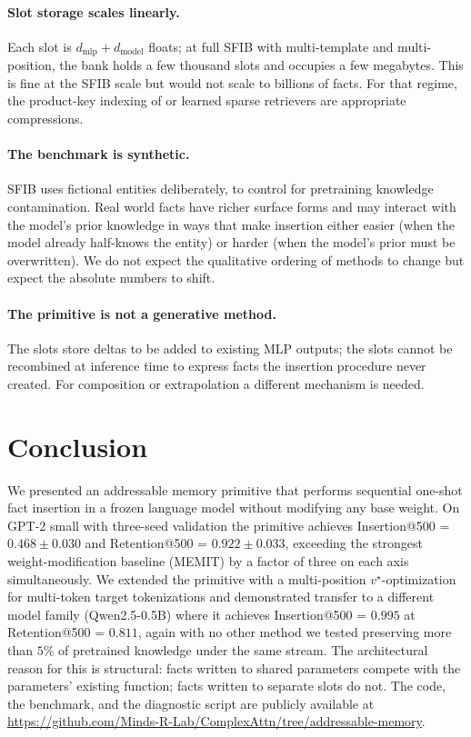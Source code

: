 \documentclass[11pt,a4paper]{article}
\begin{document}
\paragraph{Slot storage scales linearly.} Each slot is
$d_\text{mlp} + d_\text{model}$ floats; at full SFIB with multi-template
and multi-position, the bank holds a few thousand slots and occupies a
few megabytes. This is fine at the SFIB scale but would not scale to
billions of facts. For that regime, the product-key indexing of
\citet{lample2019large} or learned sparse retrievers
\citep{khattab2020colbert} are appropriate compressions.

\paragraph{The benchmark is synthetic.} SFIB uses fictional entities
deliberately, to control for pretraining knowledge contamination. Real
world facts have richer surface forms and may interact with the model's
prior knowledge in ways that make insertion either easier (when the
model already half-knows the entity) or harder (when the model's prior
must be overwritten). We do not expect the qualitative ordering of
methods to change but expect the absolute numbers to shift.

\paragraph{The primitive is not a generative method.} The slots store
deltas to be added to existing MLP outputs; the slots cannot be
recombined at inference time to express facts the insertion procedure
never created. For composition or extrapolation a different mechanism
is needed.

\section{Conclusion}

We presented an addressable memory primitive that performs sequential
one-shot fact insertion in a frozen language model without modifying
any base weight. On GPT-2 small with three-seed validation the primitive
achieves Insertion@500 = $0.468 \pm 0.030$ and Retention@500 =
$0.922 \pm 0.033$, exceeding the strongest weight-modification baseline
(MEMIT) by a factor of three on each axis simultaneously. We extended
the primitive with a multi-position $v^\star$-optimization for
multi-token target tokenizations and demonstrated transfer to a
different model family (Qwen2.5-0.5B) where it achieves Insertion@500 =
$0.995$ at Retention@500 = $0.811$, again with no other method we tested
preserving more than $5\%$ of pretrained knowledge under the same
stream. The architectural reason for this is structural: facts written
to shared parameters compete with the parameters' existing function;
facts written to separate slots do not. The code, the benchmark, and
the diagnostic script are publicly available at
\url{https://github.com/Minds-R-Lab/ComplexAttn/tree/addressable-memory}.
\end{document}
